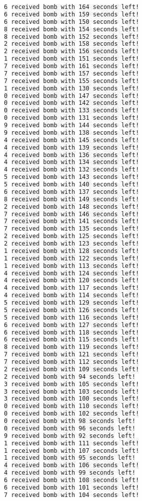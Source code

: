 \documentclass{article}
\begin{document}
\begin{lstlisting}[language=bash]
6 received bomb with 164 seconds left!
6 received bomb with 159 seconds left!
6 received bomb with 150 seconds left!
8 received bomb with 154 seconds left!
8 received bomb with 152 seconds left!
2 received bomb with 158 seconds left!
2 received bomb with 156 seconds left!
1 received bomb with 151 seconds left!
7 received bomb with 161 seconds left!
7 received bomb with 157 seconds left!
7 received bomb with 155 seconds left!
1 received bomb with 130 seconds left!
0 received bomb with 147 seconds left!
0 received bomb with 142 seconds left!
0 received bomb with 133 seconds left!
0 received bomb with 131 seconds left!
9 received bomb with 144 seconds left!
9 received bomb with 138 seconds left!
4 received bomb with 145 seconds left!
4 received bomb with 139 seconds left!
4 received bomb with 136 seconds left!
4 received bomb with 134 seconds left!
4 received bomb with 132 seconds left!
5 received bomb with 143 seconds left!
5 received bomb with 140 seconds left!
6 received bomb with 137 seconds left!
8 received bomb with 149 seconds left!
2 received bomb with 148 seconds left!
7 received bomb with 146 seconds left!
7 received bomb with 141 seconds left!
7 received bomb with 135 seconds left!
2 received bomb with 125 seconds left!
2 received bomb with 123 seconds left!
1 received bomb with 128 seconds left!
1 received bomb with 122 seconds left!
1 received bomb with 113 seconds left!
4 received bomb with 124 seconds left!
4 received bomb with 120 seconds left!
4 received bomb with 117 seconds left!
4 received bomb with 114 seconds left!
5 received bomb with 129 seconds left!
5 received bomb with 126 seconds left!
5 received bomb with 116 seconds left!
6 received bomb with 127 seconds left!
6 received bomb with 118 seconds left!
6 received bomb with 115 seconds left!
8 received bomb with 119 seconds left!
7 received bomb with 121 seconds left!
7 received bomb with 112 seconds left!
2 received bomb with 109 seconds left!
2 received bomb with 94 seconds left!
3 received bomb with 105 seconds left!
3 received bomb with 103 seconds left!
3 received bomb with 100 seconds left!
0 received bomb with 110 seconds left!
0 received bomb with 102 seconds left!
0 received bomb with 98 seconds left!
0 received bomb with 96 seconds left!
9 received bomb with 92 seconds left!
1 received bomb with 111 seconds left!
1 received bomb with 107 seconds left!
1 received bomb with 95 seconds left!
4 received bomb with 106 seconds left!
4 received bomb with 99 seconds left!
6 received bomb with 108 seconds left!
6 received bomb with 101 seconds left!
7 received bomb with 104 seconds left!

\end{lstlisting}
\end{document}
